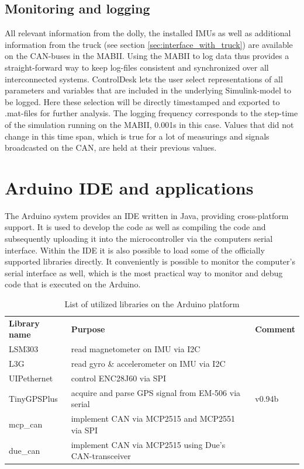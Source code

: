 \documentclass[ExampleMasters.tex]{subfiles}
\begin{document}
\subsection{Monitoring and logging}

All relevant information from the dolly, the installed \gls{IMU}s as well as additional information from the truck (see section \ref{sec:interface_with_truck}) are available on the \gls{CAN}-buses in the \gls{MABII}. Using the \gls{MABII} to log data thus provides a straight-forward way to keep log-files consistent and synchronized over all interconnected systems. ControlDesk lets the user select representations of all parameters and variables that are included in the underlying Simulink-model to be logged. Here these selection will be directly timestamped and exported to .mat-files for further analysis. The logging frequency corresponds to the step-time of the simulation running on the \gls{MABII}, 0.001s in this case. Values that did not change in this time span, which is true for a lot of measurings and signals broadcasted on the \gls{CAN}, are held at their previous values.
\section{Arduino IDE and applications}
\label{sec:arduino_applications}

The Arduino system provides an \gls{IDE}  written in Java, providing cross-platform support. It is used to develop the code as well as compiling the code and subsequently uploading it into the microcontroller via the computers serial interface. Within the IDE it is also possible to load some of the officially supported libraries directly. It conveniently is possible to monitor the computer's serial interface as well, which is the most practical way to monitor and debug code that is executed on the Arduino. 

\begin{table}[!htb]
	\label{tab:list_of_arduino_libs}
	\begin{tabular}{lll}
		\textbf{Library name} & \textbf{Purpose}                                    & \textbf{Comment} \\
		LSM303                & read magnetometer on \gls{IMU} via I2C                    &                \cite{lsm303_github}  \\
		L3G                   & read gyro \& accelerometer on \gls{IMU} via I2C           &      
		\cite{l3g_github}            \\
		UIPethernet           &     control ENC28J60 via \gls{SPI}                                                 &             \cite{uip_ethernet_github}     \\
		TinyGPSPlus           & acquire and parse GPS signal from EM-506 via serial & v0.94b\cite{tiny_gps_plus_github}     \\
		mcp\_can & implement \gls{CAN} via MCP2515 and MCP2551 via \gls{SPI}      & \cite{mcp_can_github}\\
		due\_can & implement \gls{CAN} via MCP2515 using Due's \gls{CAN}-transceiver   & \cite{due_can_github}
	\end{tabular}
	
	\caption{List of utilized libraries on the Arduino platform}
\end{table}
\end{document}
